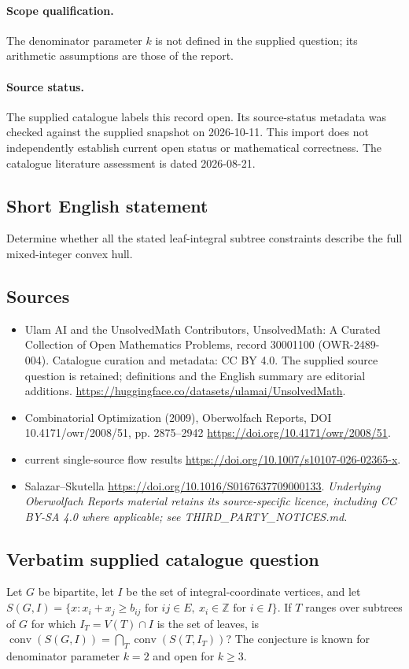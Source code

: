 \documentclass[11pt]{article}
\begin{document}
\paragraph{Scope qualification.}
The denominator parameter $k$ is not defined in the supplied question; its arithmetic assumptions are those of the report.
\paragraph{Source status.}
The supplied catalogue labels this record open. Its source-status metadata was checked against the supplied snapshot on 2026-10-11. This import does not independently establish current open status or mathematical correctness. The catalogue literature assessment is dated 2026-08-21.
\subsection{Short English statement}
Determine whether all the stated leaf-integral subtree constraints describe the full mixed-integer convex hull.
\subsection{Sources}
\begin{itemize}
\item[S1] Ulam AI and the UnsolvedMath Contributors, UnsolvedMath: A Curated Collection of Open Mathematics Problems, record 30001100 (OWR-2489-004). Catalogue curation and metadata: CC BY 4.0. The supplied source question is retained; definitions and the English summary are editorial additions.
\url{https://huggingface.co/datasets/ulamai/UnsolvedMath}.
\item[S2] Combinatorial Optimization (2009), Oberwolfach Reports, DOI 10.4171/owr/2008/51, pp. 2875--2942
\url{https://doi.org/10.4171/owr/2008/51}.
\item[S3] current single-source flow results
\url{https://doi.org/10.1007/s10107-026-02365-x}.
\item[S4] Salazar--Skutella
\url{https://doi.org/10.1016/S0167637709000133}.
\textit{Underlying Oberwolfach Reports material retains its source-specific licence, including CC BY-SA 4.0 where applicable; see THIRD\_PARTY\_NOTICES.md.}
\end{itemize}
\subsection{Verbatim supplied catalogue question}
Let $G$ be bipartite, let $I$ be the set of integral-coordinate vertices, and let $S(G,I)=\{x:x_i+x_j\geq b_{ij}\text{ for }ij\in E,\ x_i\in\mathbb{Z}\text{ for }i\in I\}$. If $T$ ranges over subtrees of $G$ for which $I_T=V(T)\cap I$ is the set of leaves, is $\operatorname{conv}(S(G,I))=\bigcap_T\operatorname{conv}(S(T,I_T))$? The conjecture is known for denominator parameter $k=2$ and open for $k\geq3$.
\end{document}
